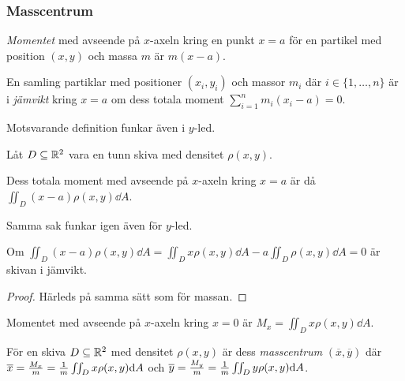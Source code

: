 \documentclass[a4paper]{article}
\begin{document}
\subsubsection{Masscentrum}
\begin{defn}[Moment]
    \emph{Momentet} med avseende på \(
        x
    \)-axeln kring en punkt \(
        x = a
    \) för en partikel med position \(
        (x,y)
    \) och massa \(
        m
    \) är \(
        m (x-a)
    \). 
\end{defn}

\begin{defn}
    En samling partiklar med positioner \(
        (x_i, y_i)
    \) och massor \(
        m_i
    \) där \(
        i \in \{1, \dots, n\}
    \) är i \emph{jämvikt} kring \(
        x = a
    \) om dess totala moment \(
        \sum_{i=1}^n m_i (x_i - a) = 0
    \).

    Motsvarande definition funkar även i \(
        y
    \)-led.
\end{defn}

\begin{sats}
    Låt \(
        D \subseteq \mathbb{R}^2
    \) vara en tunn skiva med densitet \(
        \rho(x,y)
    \).

    Dess totala moment med avseende på \(
        x
    \)-axeln kring \(
        x = a
    \) är då \(
        \iint_D (x-a)\rho(x,y) \dd A
    \).

    Samma sak funkar igen även för \(
        y
    \)-led.

    Om \(
        \iint_D (x-a)\rho(x,y) \dd A 
            = \iint_D x \rho(x,y) \dd A - a \iint_D \rho(x,y) \dd A 
            = 0
    \) är skivan i jämvikt.

    \begin{proof}
        Härleds på samma sätt som för massan.
    \end{proof}
\end{sats}

\begin{defn}
    Momentet med avseende på \(
        x
    \)-axeln kring \(
        x=0
    \) är \(
        M_x = \iint_D x \rho(x,y) \dd A
    \).
\end{defn}

\begin{sats}[Masscentrum]
    För en skiva \(
        D \subseteq \mathbb{R}^2
    \) med densitet \(
        \rho(x,y)
    \) är dess \emph{masscentrum} \(
        (\overline{x}, \overline{y})
    \) där \(
        \overline{x} = \frac{M_x}{m} = \frac{1}{m} \iint_D x \rho(x,y) \dd A
    \) och \(
        \overline{y} = \frac{M_y}{m} = \frac{1}{m} \iint_D y \rho(x,y) \dd A
    \).
\end{sats}
\end{document}
